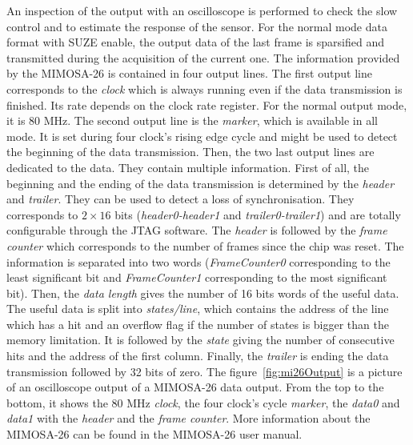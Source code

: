   An inspection of the output with an oscilloscope is performed to check the slow control and to estimate the response of the sensor.
  For the normal mode data format with SUZE enable, the output data of the last frame is sparsified and transmitted during the acquisition of the current one.
  The information provided by the MIMOSA-26 is contained in four output lines.
  The first output line corresponds to the \textit{clock} which is always running even if the data transmission is finished. 
  Its rate depends on the clock rate register. 
  For the normal output mode, it is 80 MHz.
  The second output line is the \textit{marker}, which is available in all mode.
  It is set during four clock's rising edge cycle and might be used to detect the beginning of the data transmission.
  Then, the two last output lines are dedicated to the data.
  They contain multiple information.
  First of all, the beginning and the ending of the data transmission is determined by the \textit{header} and \textit{trailer}.
  They can be used to detect a loss of synchronisation.
  They corresponds to $2 \times 16$ bits (\textit{header0-header1} and \textit{trailer0-trailer1}) and are totally configurable through the JTAG software.
  The \textit{header} is followed by the \textit{frame counter} which corresponds to the number of frames since the chip was reset. 
  The information is separated into two words (\textit{FrameCounter0} corresponding to the least significant bit and \textit{FrameCounter1} corresponding to the most significant bit).
  Then, the \textit{data length} gives the number of 16 bits words of the useful data. 
  The useful data is split into \textit{states/line}, which contains the address of the line which has a hit and an overflow flag if the number of states is bigger than the memory limitation.
  It is followed by the \textit{state} giving the number of consecutive hits and the address of the first column.
  Finally, the \textit{trailer} is ending the data transmission followed by 32 bits of zero.
  The figure~\ref{fig:mi26Output} is a picture of an oscilloscope output of a MIMOSA-26 data output. From the top to the bottom, it shows the 80 MHz \textit{clock}, the four clock's cycle \textit{marker}, the \textit{data0} and \textit{data1} with the \textit{header} and the \textit{frame counter}.
  More information about the MIMOSA-26 can be found in the MIMOSA-26 user manual\cite{manualMi26}.

